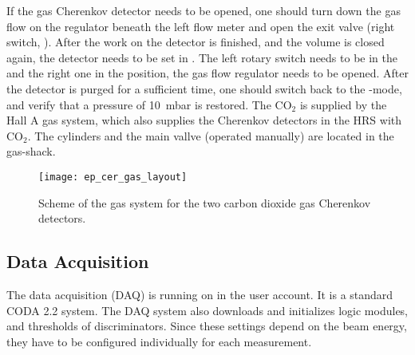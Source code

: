 {{If the gas Cherenkov detector needs to be opened, one should turn down the gas flow
on the regulator beneath the left flow meter and open the exit valve (right switch, ). 
After the work on the detector is finished,
and the volume is closed again, the detector needs to be set in .
The left rotary switch needs to be in the  and the right one in the
 position, the gas flow regulator needs to be opened. After the 
detector is purged for a sufficient time, one should switch back to the -mode,
and verify that a pressure of 10~mbar is restored. The CO$_2$ is supplied by the Hall A 
gas system, which also supplies the Cherenkov detectors in the HRS with CO$_2$. The cylinders
and the main vallve (operated manually) are located in the gas-shack.

\begin{figure}[bht]
    \begin{center}
        \texttt{[image: ep\_cer\_gas\_layout]}
    \end{center}
    \caption[eP: Layout of CO2 Gas System]{
	    Scheme of the gas system for the two carbon dioxide gas Cherenkov detectors.
            }
    \label{fig:ep_cer_gas_layout} 
\end{figure}  

}

\subsection{Data Acquisition}
\label{sec:ep_daq}

The data acquisition (DAQ) is running on  in the
 user account. It is a standard CODA 2.2 system.
The DAQ system also downloads and initializes logic modules,
and thresholds of discriminators. Since these settings depend
on the beam energy, they have to be configured individually for 
each measurement.
}
